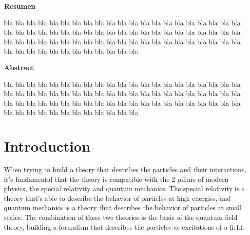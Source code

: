 \documentclass[11pt,a4paper,twoside,pdf]{article}
\numberwithin{equation}{section}
\begin{document}
\newpage
%
\begin{center}
{\bf Resumen}
\bigskip

\begin{minipage}{0.8\linewidth}
bla bla bla bla bla bla bla bla bla bla bla bla bla bla bla
bla bla bla bla bla bla bla bla bla bla bla bla bla bla bla
bla bla bla bla bla bla bla bla bla bla bla bla bla bla bla 
bla bla bla bla bla bla bla bla bla bla bla bla bla bla bla
bla bla bla bla bla bla bla bla bla bla bla bla bla bla bla
\end{minipage}

\newpage

{\bf Abstract} 
\bigskip

\begin{minipage}{0.8\linewidth}
bla bla bla bla bla bla bla bla bla bla bla bla bla bla bla
bla bla bla bla bla bla bla bla bla bla bla bla bla bla bla
bla bla bla bla bla bla bla bla bla bla bla bla bla bla bla 
bla bla bla bla bla bla bla bla bla bla bla bla bla bla bla
bla bla bla bla bla bla bla bla bla bla bla bla bla bla bla
\end{minipage}

\newpage

\end{center}


\pagestyle{empty}       %
\tableofcontents
\setcounter{page}{0}
\cleardoublepage        %


\pagestyle{fancy}
\fancyhead[RO,LE]{\leftmark}
\fancyhead[LO,RE]{\thepage}
\fancyfoot{}

\newpage

\section{Introduction}

When trying to build a theory that describes the particles and their interactions, 
it's fundamental that the theory is compatible with the 2 pillars of modern physics,
the special relativity and quantum mechanics. The special relativity is a theory 
that's able to describe the behavior of particles at high energies, and quantum 
mechanics is a theory that describes the behavior of particles at small scales.
The combination of these two theories is the basis of the quantum field theory,
building a formalism that describes the particles as excitations of a field.
\end{document}
